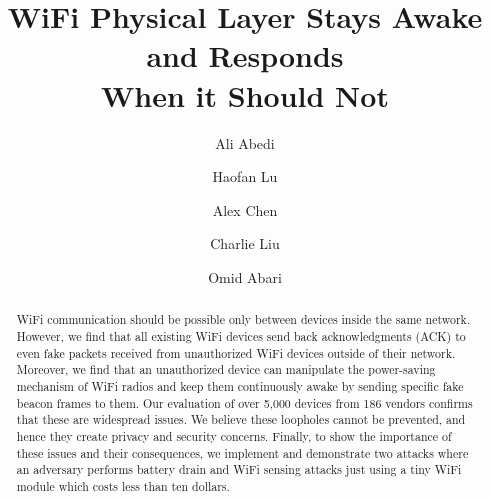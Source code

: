 \documentclass[sigconf,9pt]{acmart}
\begin{document}
\title{WiFi Physical Layer Stays Awake and Responds \\When it Should Not}


\author{Ali Abedi}

\author{Haofan Lu}

\author{Alex Chen}

\author{Charlie Liu}

\author{Omid Abari}

\begin{abstract}
WiFi communication should be possible only between devices inside the same network. However, we find that all existing WiFi devices send back acknowledgments (ACK) to even fake packets received from unauthorized WiFi devices outside of their network. Moreover, we find that an unauthorized device can manipulate the power-saving mechanism of WiFi radios and keep them continuously awake by sending specific fake beacon frames to them. Our evaluation of over 5,000 devices from 186 vendors confirms that these are widespread issues. We believe these loopholes cannot be prevented, and hence they create privacy and security concerns.  Finally, to show the importance of these issues and their consequences, we implement and demonstrate two attacks where an adversary performs battery drain and WiFi sensing attacks just using a tiny WiFi module which costs less than ten dollars.  
\end{abstract}
\maketitle
\pagestyle{plain} %









% 
% 
% 
% 



\end{document}
